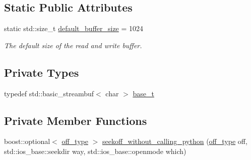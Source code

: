 \subsection*{Static Public Attributes}
\begin{DoxyCompactItemize}
\item 
static std\+::size\+\_\+t \hyperlink{classecto_1_1py_1_1streambuf_a7a20a01fb9aeda8677b3c65bccd6b59d}{default\+\_\+buffer\+\_\+size} = 1024
\begin{DoxyCompactList}\small\item\em The default size of the read and write buffer. \end{DoxyCompactList}\end{DoxyCompactItemize}
\subsection*{Private Types}
\begin{DoxyCompactItemize}
\item 
typedef std\+::basic\+\_\+streambuf$<$ char $>$ \hyperlink{classecto_1_1py_1_1streambuf_ac46c69e7d213fec69f80d1943389366c}{base\+\_\+t}
\end{DoxyCompactItemize}
\subsection*{Private Member Functions}
\begin{DoxyCompactItemize}
\item 
boost\+::optional$<$ \hyperlink{classecto_1_1py_1_1streambuf_aa01772d1599fc51089a209a69fcab7c7}{off\+\_\+type} $>$ \hyperlink{classecto_1_1py_1_1streambuf_a367a7e20642d4a3ebcefd2f6abc3c3e6}{seekoff\+\_\+without\+\_\+calling\+\_\+python} (\hyperlink{classecto_1_1py_1_1streambuf_aa01772d1599fc51089a209a69fcab7c7}{off\+\_\+type} off, std\+::ios\+\_\+base\+::seekdir way, std\+::ios\+\_\+base\+::openmode which)
\end{DoxyCompactItemize}
